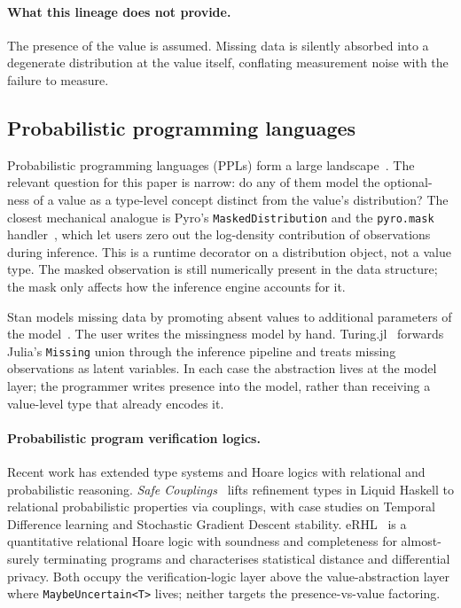 \paragraph{What this lineage does not provide.} The presence of the value is
assumed. Missing data is silently absorbed into a degenerate distribution at
the value itself, conflating measurement noise with the failure to measure.

\subsection{Probabilistic programming languages}
\label{sec:bg:ppl}

Probabilistic programming languages (PPLs) form a large
landscape~\cite{tolpin2016anglican,carpenter2017stan,bingham2019pyro,ge2025turing,cusumano2019gen,narayanan2016hakaru,holtzen2020dice,gehr2016psi,gehr2020lambdapsi,milch2005blog,kimmig2011problog,pfeffer2009figaro}.
The relevant question for this paper is narrow: do any of them model the
optional-ness of a value as a type-level concept distinct from the value's
distribution? The closest mechanical analogue is Pyro's
\texttt{MaskedDistribution} and the \texttt{pyro.mask} handler~\cite{bingham2019pyro},
which let users zero out the log-density contribution of observations during
inference. This is a runtime decorator on a distribution object, not a value
type. The masked observation is still numerically present in the
data structure; the mask only affects how the inference engine accounts for it.

Stan models missing data by promoting absent values to additional parameters
of the model~\cite{carpenter2017stan}. The user writes the missingness model
by hand. Turing.jl~\cite{ge2025turing} forwards Julia's \texttt{Missing} union
through the inference pipeline and treats missing observations as latent
variables. In each case the abstraction lives at the model layer; the
programmer writes presence into the model, rather than receiving a value-level
type that already encodes it.

\paragraph{Probabilistic program verification logics.} Recent work has
extended type systems and Hoare logics with relational and probabilistic
reasoning. \emph{Safe Couplings}~\cite{vasilenko2022safecouplings} lifts
refinement types in Liquid Haskell to relational probabilistic properties via
couplings, with case studies on Temporal Difference learning and Stochastic
Gradient Descent stability. eRHL~\cite{avanzini2025erhl} is a quantitative
relational Hoare logic with soundness and completeness for almost-surely
terminating programs and characterises statistical distance and differential
privacy. Both occupy the verification-logic layer above the value-abstraction
layer where \texttt{MaybeUncertain<T>} lives; neither targets the
presence-vs-value factoring.


